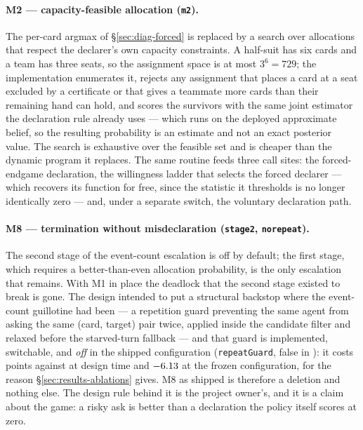 \paragraph{M2 --- capacity-feasible allocation (\texttt{m2}).} The per-card argmax
of \S\ref{sec:diag-forced} is replaced by a search over allocations that respect
the declarer's own capacity constraints. A half-suit has six cards and a team has
three seats, so the assignment space is at most $3^6 = 729$; the implementation
enumerates it, rejects any assignment that places a card at a seat excluded by a
certificate or that gives a teammate more cards than their remaining hand can
hold, and scores the survivors with the same joint estimator the declaration rule
already uses --- which runs on the deployed approximate belief, so the resulting
probability is an estimate and not an exact posterior value. The search is
exhaustive over the feasible set and is cheaper than the dynamic program it
replaces. The same routine feeds three call sites: the forced-endgame
declaration, the willingness ladder that selects the forced declarer --- which
recovers its function for free, since the statistic it thresholds is no longer
identically zero --- and, under a separate switch, the voluntary declaration
path.

\paragraph{M8 --- termination without misdeclaration (\texttt{stage2},
\texttt{norepeat}).} The second stage of the event-count escalation is off by
default; the first stage, which requires a better-than-even allocation
probability, is the only escalation that remains. With M1 in place the deadlock
that the second stage existed to break is gone. The design intended to put a
structural backstop where the event-count guillotine had been --- a repetition
guard preventing the same agent from asking the same (card, target) pair twice,
applied inside the candidate filter and relaxed before the starved-turn fallback
--- and that guard is implemented, switchable, and \emph{off} in the shipped
configuration (\texttt{repeatGuard}, false in ): it
costs \numGuardReject{} points against \vfour{} at design time and
$-6.13$ at the frozen configuration, for the reason
\S\ref{sec:results-ablations} gives. M8 as shipped is therefore a deletion and
nothing else. The design rule behind it is the project owner's, and it is a claim
about the game: a risky ask is better than a declaration the policy itself scores
at zero.

